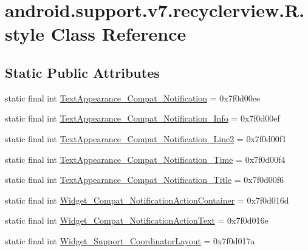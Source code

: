 \hypertarget{classandroid_1_1support_1_1v7_1_1recyclerview_1_1_r_1_1style}{}\section{android.\+support.\+v7.\+recyclerview.\+R.\+style Class Reference}
\label{classandroid_1_1support_1_1v7_1_1recyclerview_1_1_r_1_1style}
\subsection*{Static Public Attributes}
\begin{DoxyCompactItemize}
\item 
static final int \mbox{\hyperlink{classandroid_1_1support_1_1v7_1_1recyclerview_1_1_r_1_1style_a337bde64ff42282b58423091ecdd204f}{Text\+Appearance\+\_\+\+Compat\+\_\+\+Notification}} = 0x7f0d00ee
\item 
static final int \mbox{\hyperlink{classandroid_1_1support_1_1v7_1_1recyclerview_1_1_r_1_1style_ad4b4114dfa46e18ceb35e579c2f2354a}{Text\+Appearance\+\_\+\+Compat\+\_\+\+Notification\+\_\+\+Info}} = 0x7f0d00ef
\item 
static final int \mbox{\hyperlink{classandroid_1_1support_1_1v7_1_1recyclerview_1_1_r_1_1style_a520bcc098762ac1db8fe7e6e8f7bfd0f}{Text\+Appearance\+\_\+\+Compat\+\_\+\+Notification\+\_\+\+Line2}} = 0x7f0d00f1
\item 
static final int \mbox{\hyperlink{classandroid_1_1support_1_1v7_1_1recyclerview_1_1_r_1_1style_a2ff1107d17a096b297c74dcf138d26b0}{Text\+Appearance\+\_\+\+Compat\+\_\+\+Notification\+\_\+\+Time}} = 0x7f0d00f4
\item 
static final int \mbox{\hyperlink{classandroid_1_1support_1_1v7_1_1recyclerview_1_1_r_1_1style_ac96b6a57ff1ba29bb1b8410d41940117}{Text\+Appearance\+\_\+\+Compat\+\_\+\+Notification\+\_\+\+Title}} = 0x7f0d00f6
\item 
static final int \mbox{\hyperlink{classandroid_1_1support_1_1v7_1_1recyclerview_1_1_r_1_1style_ac051560c049d71a142258af4e545858e}{Widget\+\_\+\+Compat\+\_\+\+Notification\+Action\+Container}} = 0x7f0d016d
\item 
static final int \mbox{\hyperlink{classandroid_1_1support_1_1v7_1_1recyclerview_1_1_r_1_1style_a656830361a44335514a2aa300f895e2f}{Widget\+\_\+\+Compat\+\_\+\+Notification\+Action\+Text}} = 0x7f0d016e
\item 
static final int \mbox{\hyperlink{classandroid_1_1support_1_1v7_1_1recyclerview_1_1_r_1_1style_a0379a9e12a39967ad88c5d7d5f6ae645}{Widget\+\_\+\+Support\+\_\+\+Coordinator\+Layout}} = 0x7f0d017a
\end{DoxyCompactItemize}
